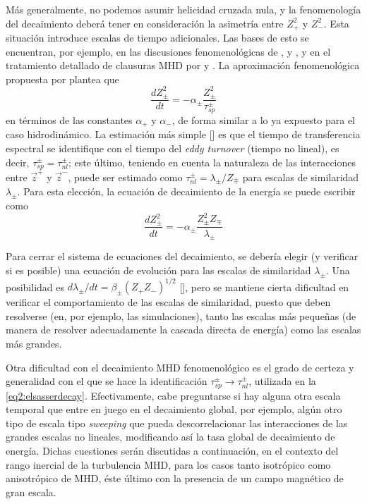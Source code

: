 Más generalmente, no podemos asumir helicidad cruzada nula, y la
fenomenología del decaimiento deberá tener en consideración la
asimetría entre $Z_+^2$ y $Z_-^2$. Esta situación introduce escalas de
tiempo adicionales. Las bases de esto se encuentran, por ejemplo, en
las discusiones fenomenológicas de \cite{iroshnikov_turbulence_1964},
\cite{kraichnan_inertial-range_1965} y \cite{dobrowolny_fully_1980}, y
en el tratamiento detallado de clausuras MHD por
\cite{pouquet_strong_1976} y \cite{grappin_dependence_1983}. La
aproximación fenomenológica propuesta por
\cite{hossain_phenomenology_1995} plantea que
\begin{equation}
  \frac{dZ_\pm^2}{dt} = -\alpha_\pm \frac{Z_\pm^2}{\tau_{sp}^\pm}
\end{equation}
en términos de las constantes $\alpha_+$ y $\alpha_-$, de forma
similar a lo ya expuesto para el caso hidrodinámico. La estimación más
simple [\cite{pouquet_strong_1976, grappin_dependence_1983}] es que el
tiempo de transferencia espectral se identifique con el tiempo del
\textit{eddy turnover} (tiempo no lineal), es decir, $\tau_{sp}^\pm =
\tau_{nl}^\pm$; este último, teniendo en cuenta la naturaleza de las
interacciones entre $\vec{z}^+$ y $\vec{z}^-$, puede ser estimado como
$\tau_{nl}^\pm = \lambda_\pm / Z_\mp$ para escalas de similaridad
$\lambda_\pm$. Para esta elección, la ecuación de decaimiento de la
energía se puede escribir como
\begin{equation}\label{eq2:elsasserdecay}
  \frac{dZ_\pm^2}{dt} = -\alpha_\pm \frac{Z_\pm^2 Z_\mp}{\lambda_\pm}
\end{equation}

Para cerrar el sistema de ecuaciones del decaimiento, se debería
elegir (y verificar si es posible) una ecuación de evolución para las
escalas de similaridad $\lambda_\pm$. Una posibilidad es
$d\lambda_\pm/dt = \beta_\pm (Z_+Z_-)^{1/2}$
[\cite{hossain_phenomenology_1995}], pero se mantiene cierta dificultad
en verificar el comportamiento de las escalas de similaridad, puesto
que deben resolverse (en, por ejemplo, las simulaciones), tanto las
escalas más pequeñas (de manera de resolver adecuadamente la cascada
directa de energía) como las escalas más grandes.

Otra dificultad con el decaimiento MHD fenomenológico es el grado de
certeza y generalidad con el que se hace la identificación
$\tau_{sp}^\pm \rightarrow \tau_{nl}^\pm$, utilizada en la
\cref{eq2:elsasserdecay}. Efectivamente, cabe preguntarse si hay alguna
otra escala temporal que entre en juego en el decaimiento global, por
ejemplo, algún otro tipo de escala tipo \textit{sweeping} que pueda
descorrelacionar las interacciones de las grandes escalas no lineales,
modificando así la tasa global de decaimiento de energía. Dichas
cuestiones serán discutidas a continuación, en el contexto del rango
inercial de la turbulencia MHD, para los casos tanto isotrópico como
anisotrópico de MHD, éste último con la presencia de un campo
magnético de gran escala.

